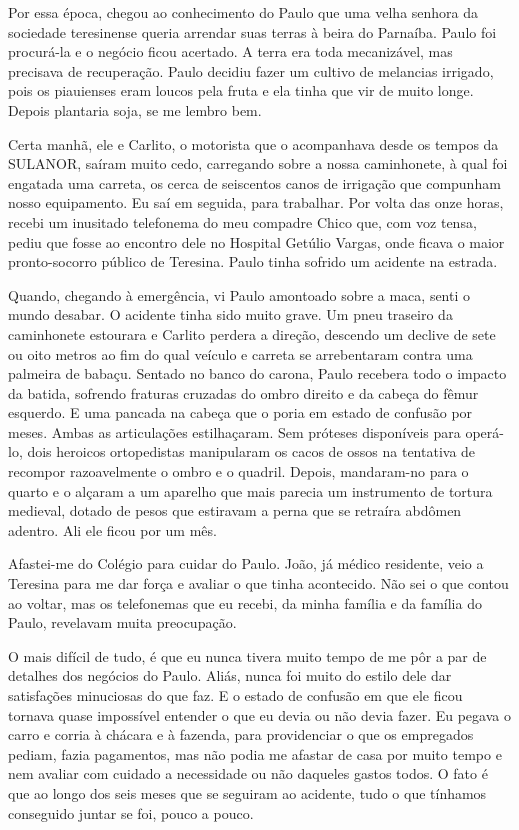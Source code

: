 Por essa época, chegou ao conhecimento do Paulo que uma velha senhora da sociedade teresinense queria arrendar suas terras à beira do Parnaíba.
Paulo foi procurá-la e o negócio ficou acertado.
A terra era toda mecanizável, mas precisava de recuperação.
Paulo decidiu fazer um cultivo de melancias irrigado, pois os piauienses eram loucos pela fruta e ela tinha que vir de muito longe.
Depois plantaria soja, se me lembro bem.

Certa manhã, ele e Carlito, o motorista que o acompanhava desde os tempos da SULANOR, saíram muito cedo, carregando sobre a nossa caminhonete, à qual foi engatada uma carreta, os cerca de seiscentos canos de irrigação que compunham nosso equipamento.
Eu saí em seguida, para trabalhar.
Por volta das onze horas, recebi um inusitado telefonema do meu compadre Chico que, com voz tensa, pediu que fosse ao encontro dele no Hospital Getúlio Vargas, onde ficava o maior pronto-socorro público de Teresina.
Paulo tinha sofrido um acidente na estrada.


Quando, chegando à emergência, vi Paulo amontoado sobre a maca, senti o mundo desabar.
O acidente tinha sido muito grave.
Um pneu traseiro da caminhonete estourara e Carlito perdera a direção, descendo um declive de sete ou oito metros ao fim do qual veículo e carreta se arrebentaram contra uma palmeira de babaçu.
Sentado no banco do carona, Paulo recebera todo o impacto da batida, sofrendo fraturas cruzadas do ombro direito e da cabeça do fêmur esquerdo.
E uma pancada na cabeça que o poria em estado de confusão por meses.
Ambas as articulações estilhaçaram.
Sem próteses disponíveis para operá-lo, dois heroicos ortopedistas manipularam os cacos de ossos na tentativa de recompor razoavelmente o ombro e o quadril.
Depois, mandaram-no para o quarto e o alçaram a um aparelho que mais parecia um instrumento de tortura medieval, dotado de pesos que estiravam a perna que se retraíra abdômen adentro.
Ali ele ficou por um mês.

Afastei-me do Colégio para cuidar do Paulo.
João, já médico residente, veio a Teresina para me dar força e avaliar o que tinha acontecido.
Não sei o que contou ao voltar, mas os telefonemas que eu recebi, da minha família e da família do Paulo, revelavam muita preocupação.

O mais difícil de tudo, é que eu nunca tivera muito tempo de me pôr a par de detalhes dos negócios do Paulo.
Aliás, nunca foi muito do estilo dele dar satisfações minuciosas do que faz.
E o estado de confusão em que ele ficou tornava quase impossível entender o que eu devia ou não devia fazer.
Eu pegava o carro e corria à chácara e à fazenda, para providenciar o que os empregados pediam, fazia pagamentos, mas não podia me afastar de casa por muito tempo e nem avaliar com cuidado a necessidade ou não daqueles gastos todos.
O fato é que ao longo dos seis meses que se seguiram ao acidente, tudo o que tínhamos conseguido juntar se foi, pouco a pouco.

